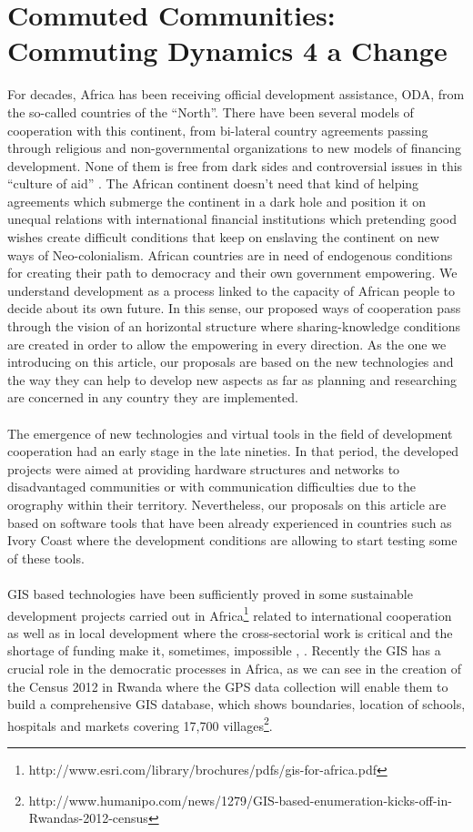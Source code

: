 \newpage

\section{Commuted Communities: Commuting Dynamics 4 a Change}

For decades, Africa has been receiving official development assistance, ODA, from the so-called countries of the “North”. There have been several models of cooperation with this continent, from bi-lateral country agreements passing through religious and non-governmental organizations to new models of financing development. None of them is free from dark sides and controversial issues in this “culture of aid” \citep{moyo2009dead}. The African continent doesn’t need that kind of helping agreements which submerge the continent in a dark hole and position it on unequal relations with international financial institutions which pretending good wishes create difficult conditions that keep on enslaving the continent on new ways of Neo-colonialism. African countries are in need of endogenous conditions for creating their path to democracy and their own government empowering. We understand development as a process linked to the capacity of African people to decide about its own future\citep{sen2000desarrollo}. In this sense, our proposed ways of cooperation pass through the vision of an horizontal structure where sharing-knowledge conditions are created in order to allow the empowering in every direction. As the one we introducing on this article, our proposals are based on the new technologies and the way they can help to develop new aspects as far as planning and researching are concerned in any country they are implemented.
\\
\\
The emergence of new technologies and virtual tools in the field of development cooperation had an early stage in the late nineties\citep{de2005global}. In that period, the developed projects were aimed at providing hardware structures and networks to disadvantaged communities or with communication difficulties due to the orography within their territory. Nevertheless, our proposals on this article are based on software tools that have been already experienced in countries such as Ivory Coast where the development conditions are allowing to start testing some of these tools.
\\
\\
GIS based technologies have been sufficiently proved in some sustainable development projects carried out in Africa\footnote{http://www.esri.com/library/brochures/pdfs/gis-for-africa.pdf} related to international cooperation as well as in local development where the cross-sectorial work is critical and the shortage of funding make it, sometimes, impossible \citep{mitchell1997zeroing}, \citep{craig2002community}. Recently the GIS has a crucial role in the democratic processes in Africa, as we can see in the creation of the Census 2012 in Rwanda where the GPS data collection will enable them to build a comprehensive GIS database, which shows boundaries, location of schools, hospitals and markets covering 17,700 villages\footnote{http://www.humanipo.com/news/1279/GIS-based-enumeration-kicks-off-in-Rwandas-2012-census}.
